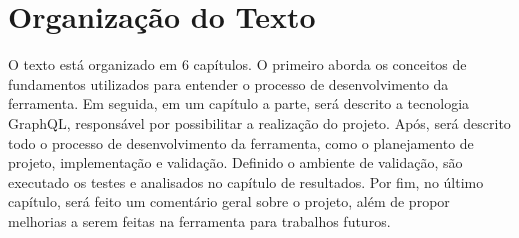 \section[Organização do Texto]{Organização do Texto}

O texto está organizado em 6 capítulos. O primeiro aborda os conceitos de fundamentos utilizados para entender o processo de desenvolvimento da ferramenta. Em seguida, em um capítulo a parte, será descrito a tecnologia GraphQL, responsável por possibilitar a realização do projeto. Após, será descrito todo o processo de desenvolvimento da ferramenta, como o planejamento de projeto, implementação e validação. Definido o ambiente de validação, são executado os testes e analisados no capítulo de resultados. Por fim, no último capítulo, será feito um comentário geral sobre o projeto, além de propor melhorias a serem feitas na ferramenta para trabalhos futuros.
